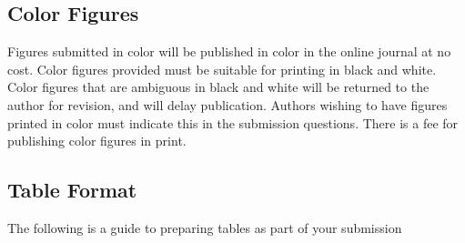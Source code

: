 \documentclass[Journal,LineNumbers]{ascelike-new}
\begin{document}
\subsection{Color Figures}\label{color-figures}

Figures submitted in color will be published in color in the online
journal at no cost. Color figures provided must be suitable for printing
in black and white. Color figures that are ambiguous in black and white
will be returned to the author for revision, and will delay publication.
Authors wishing to have figures printed in color must indicate this in
the submission questions. There is a fee for publishing color figures in
print.

\subsection{Table Format}\label{table-format}

The following is a guide to preparing tables as part of your submission
\end{document}
